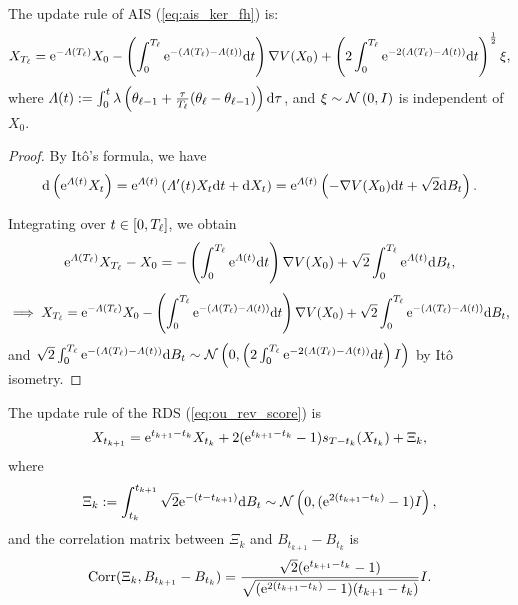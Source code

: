 \begin{lemma}
    The update rule of AIS (\cref{eq:ais_ker_fh}) is:
    $$X_{T_\ell}=\mathrm{e}^{-\varLambda(T_\ell)}X_0-\left(\int_0^{T_\ell}\mathrm{e}^{-(\varLambda(T_\ell)-\varLambda(t))}\mathrm{d} t\right)\nabla V(X_0)+\left(2\int_0^{T_\ell}\mathrm{e}^{-2(\varLambda(T_\ell)-\varLambda(t))}\mathrm{d} t\right)^\frac{1}{2}\xi,$$
    where $\varLambda(t):=\int_0^t\lambda\left(\theta_{\ell-1}+\frac{\tau}{T_\ell}(\theta_\ell-\theta_{\ell-1})\right)\mathrm{d}\tau$, and $\xi\sim\operatorname{\mathcal{N}}\left(0,I\right)$ is independent of $X_0$.
    \label{lem:ais_ker_fh_update}
\end{lemma}

\begin{proof}
    By It\^o's formula, we have
    $$\mathrm{d}\left(\mathrm{e}^{\varLambda(t)}X_t\right)=\mathrm{e}^{\varLambda(t)}\left(\varLambda'(t)X_t\mathrm{d} t+\mathrm{d} X_t\right)=\mathrm{e}^{\varLambda(t)}\left(-\nabla V(X_0)\mathrm{d} t+\sqrt{2}\mathrm{d} B_t\right).$$

    Integrating over $t\in[0,T_\ell]$, we obtain
    $$\mathrm{e}^{\varLambda(T_\ell)}X_{T_\ell}-X_0=-\left(\int_{0}^{T_\ell}\mathrm{e}^{\varLambda(t)}\mathrm{d} t\right)\nabla V(X_0)+\sqrt{2}\int_0^{T_\ell}\mathrm{e}^{\varLambda(t)}\mathrm{d} B_t,$$
    $$\implies X_{T_\ell}=\mathrm{e}^{-\varLambda(T_\ell)}X_0-\left(\int_0^{T_\ell}\mathrm{e}^{-(\varLambda(T_\ell)-\varLambda(t))}\mathrm{d} t\right)\nabla V(X_0)+\sqrt{2}\int_0^{T_\ell}\mathrm{e}^{-(\varLambda(T_\ell)-\varLambda(t))}\mathrm{d} B_t,$$
    and $\sqrt{2}\int_0^{T_\ell}\mathrm{e}^{-(\varLambda(T_\ell)-\varLambda(t))}\mathrm{d} B_t\sim\operatorname{\mathcal{N}}\left(0,\left(2\int_0^{T_\ell}\mathrm{e}^{-2(\varLambda(T_\ell)-\varLambda(t))}\mathrm{d} t\right)I\right)$ by It\^o isometry.
\end{proof}

\begin{lemma}
    The update rule of the RDS (\cref{eq:ou_rev_score}) is
    $$X_{t_{k+1}}=\mathrm{e}^{t_{k+1}-t_k}X_{t_k}+2(\mathrm{e}^{t_{k+1}-t_k}-1)s_{T-t_k}(X_{t_k})+\Xi_k,$$
    where 
    $$\Xi_k:=\int_{t_k}^{t_{k+1}}\sqrt{2}\mathrm{e}^{-(t-t_{k+1})}\mathrm{d} B_t\sim\operatorname{\mathcal{N}}\left(0,(\mathrm{e}^{2(t_{k+1}-t_k)}-1)I\right),$$
    and the correlation matrix between $\Xi_k$ and $B_{t_{k+1}}-B_{t_k}$ is
    $$\operatorname{Corr}(\Xi_k,B_{t_{k+1}}-B_{t_k})=\frac{\sqrt{2}(\mathrm{e}^{t_{k+1}-t_k}-1)}{\sqrt{(\mathrm{e}^{2(t_{k+1}-t_k)}-1)(t_{k+1}-t_k)}}I.$$
    \label{lem:rds_update}
\end{lemma}

